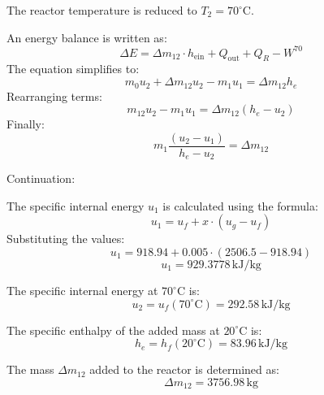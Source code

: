 The reactor temperature is reduced to \( T_2 = 70^\circ\text{C} \).  

An energy balance is written as:  
\[
\Delta E = \Delta m_{12} \cdot h_{\text{ein}} + Q_{\text{out}} + Q_R - W^{70}
\]  
The equation simplifies to:  
\[
m_0 u_2 + \Delta m_{12} u_2 - m_1 u_1 = \Delta m_{12} h_e
\]  
Rearranging terms:  
\[
m_{12} u_2 - m_1 u_1 = \Delta m_{12} (h_e - u_2)
\]  
Finally:  
\[
m_1 \frac{(u_2 - u_1)}{h_e - u_2} = \Delta m_{12}
\]

Continuation:  

The specific internal energy \( u_1 \) is calculated using the formula:  
\[
u_1 = u_f + x \cdot (u_g - u_f)
\]  
Substituting the values:  
\[
u_1 = 918.94 + 0.005 \cdot (2506.5 - 918.94)
\]  
\[
u_1 = 929.3778 \, \text{kJ/kg}
\]  

The specific internal energy at \( 70^\circ\text{C} \) is:  
\[
u_2 = u_f(70^\circ\text{C}) = 292.58 \, \text{kJ/kg}
\]  

The specific enthalpy of the added mass at \( 20^\circ\text{C} \) is:  
\[
h_e = h_f(20^\circ\text{C}) = 83.96 \, \text{kJ/kg}
\]  

The mass \( \Delta m_{12} \) added to the reactor is determined as:  
\[
\Delta m_{12} = 3756.98 \, \text{kg}
\]